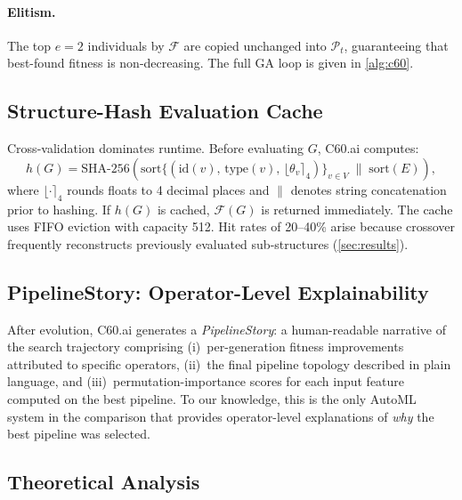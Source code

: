 \documentclass{article}
\theoremstyle{definition}
\theoremstyle{plain}
\theoremstyle{remark}
\begin{document}
\paragraph{Elitism.}
The top $e = 2$ individuals by $\mathcal{F}$ are copied unchanged into
$\mathcal{P}_t$, guaranteeing that best-found fitness is non-decreasing.
The full GA loop is given in \cref{alg:c60}.

\subsection{Structure-Hash Evaluation Cache}
\label{sec:cache}

Cross-validation dominates runtime.
Before evaluating $G$, C60.ai computes:
\begin{equation}
  h(G) = \mathrm{SHA\text{-}256}\!\left(
    \mathrm{sort}\bigl\{(\mathrm{id}(v),\,\mathrm{type}(v),\,
    \lfloor\theta_v \rceil_4)\bigr\}_{v \in V}
    \;\|\; \mathrm{sort}(E)
  \right),
  \label{eq:hash}
\end{equation}
where $\lfloor\cdot\rceil_4$ rounds floats to 4 decimal places and $\|$
denotes string concatenation prior to hashing.
If $h(G)$ is cached, $\mathcal{F}(G)$ is returned immediately.
The cache uses FIFO eviction with capacity 512.
Hit rates of 20--40\% arise because crossover frequently reconstructs
previously evaluated sub-structures (\cref{sec:results}).

\subsection{PipelineStory: Operator-Level Explainability}

After evolution, C60.ai generates a \emph{PipelineStory}: a human-readable
narrative of the search trajectory comprising (i)~per-generation fitness
improvements attributed to specific operators, (ii)~the final pipeline
topology described in plain language, and (iii)~permutation-importance scores
for each input feature computed on the best pipeline.
To our knowledge, this is the only AutoML system in the comparison that
provides operator-level explanations of \emph{why} the best pipeline was
selected.

\subsection{Theoretical Analysis}
\label{sec:theory}
\end{document}
